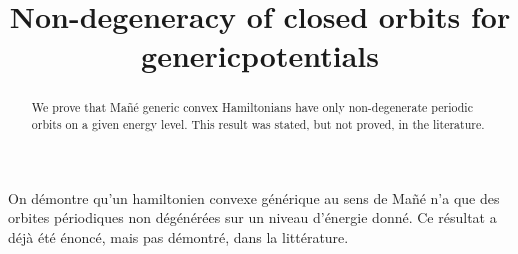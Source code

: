 \documentclass[JEP,XML,SOM,Unicode,published]{cedram}
\theoremstyle{plain}
\theoremstyle{definition}
\begin{document}
\frontmatter

\title{Non-degeneracy of closed orbits for generic\nobreakspace potentials}

\author[\initial{P.} \lastname{Bernard}]{ }
\address{PSL Research University, Université Paris-Dauphine, CEREMADE (UMR CNRS 7534),\\
75775 Paris Cedex 16, France}
\urladdr{}

\begin{abstract}
We prove that Mañé generic convex Hamiltonians have only non-degenerate periodic orbits on a given energy level. This result was stated, but not proved, in the literature.
\end{abstract}





\begin{altabstract}
On démontre qu'un hamiltonien convexe générique au sens de Mañé n'a que des orbites périodiques non dégénérées sur un niveau d'énergie donné. Ce résultat a déjà été énoncé, mais pas démontré, dans la littérature.
\end{altabstract}

\maketitle

\tableofcontents
\mainmatter
\end{document}
